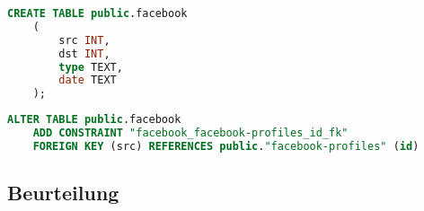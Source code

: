\begin{lstlisting}[language=SQL,caption=Anlegen der Tabelle facebook,frame=single]
    CREATE TABLE public.facebook
    (
        src INT,
        dst INT,
        type TEXT,
        date TEXT
    );
\end{lstlisting}

\begin{lstlisting}[language=SQL,caption=Hinzufügen von Fremdschlüsseln,frame=single]
    ALTER TABLE public.facebook
    ADD CONSTRAINT "facebook_facebook-profiles_id_fk"
    FOREIGN KEY (src) REFERENCES public."facebook-profiles" (id)
\end{lstlisting}

\subsection{Beurteilung}